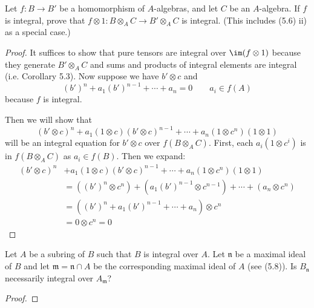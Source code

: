 \begin{exercise}
	Let $f \colon B \to B'$ be a homomorphism of $A$-algebras, and let $C$ be an $A$-algebra. If $f$ is integral, prove that $f \otimes 1\colon B \otimes_A C \to B' \otimes_A C$ is integral. (This includes (5.6) ii) as a special case.)
\end{exercise}
\begin{proof}
	It suffices to show that pure tensors are integral over $\im(f \otimes 1) $ because they generate $B' \otimes _A C $ and sums and products of integral elements are integral (i.e. Corollary 5.3).
	Now suppose we have $b' \otimes c $ and
	\[
		(b')^n + a_1 (b')^{n-1} + \cdots + a_n = 0 \qquad a_i \in f(A)
	\] 
	because $f $ is integral.

	Then we will show that
	\[
		(b' \otimes c)^n + a_1(1 \otimes c) (b' \otimes c)^{n-1} + \cdots + a_n(1 \otimes c^n)(1 \otimes 1)
	\] 
	will be an integral equation for $b' \otimes c $ over $f(B \otimes_A C) $.
	First, each $a_i(1 \otimes c^i) $ is in $f(B \otimes_A C) $ as $a_i \in f(B) $.
	Then we expand:
	\begin{align*}
		(b' \otimes c)^n &+ a_1(1 \otimes c) (b' \otimes c)^{n-1} + \cdots + a_n(1 \otimes c^n)(1 \otimes 1)\\
		&= ((b')^n \otimes c^n) + (a_{1} (b')^{n-1}  \otimes c^{n-1} ) + \cdots + (a_n \otimes c^n)\\
		&= ((b')^n + a_1 (b')^{n-1} + \cdots + a_n) \otimes c^n\\
		&= 0 \otimes c^n = 0
	\end{align*}
\end{proof}

\begin{exercise}
	Let $A$ be a subring of $B$ such that $B$ is integral over $A$. Let $\mathfrak{n}$ be a maximal ideal of $B$ and let $\mathfrak{m} = \mathfrak{n} \cap A$ be the corresponding maximal ideal of $A$ (see (5.8)). Is $B_{\mathfrak{n}}$ necessarily integral over $A_\mathfrak{m}$?
\end{exercise}
\begin{proof}
\end{proof}

